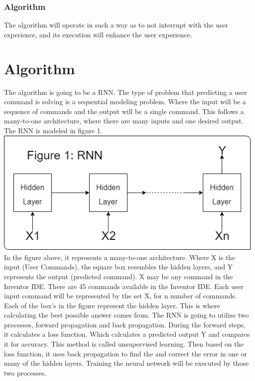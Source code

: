 \documentclass[onecolumn, draftclsnofoot,10pt, compsoc]{IEEEtran}
\begin{document}
\subsubsection{Algorithm}
The algorithm will operate in such a way as to not interrupt with the user experience, and its execution will enhance the user experience.
\null\newpage
\section{Algorithm}
The algorithm is going to be a RNN. The type of problem that predicting a user command is solving is a sequential modeling problem. Where the input will be a sequence of commands and the output will be a single command. This follows a many-to-one architecture, where there are many inputs and one desired output. The RNN is modeled in figure 1.\newline
\includegraphics{RNN.png} 
\newline
In the figure above, it represents a many-to-one architecture. Where X is the input (User Commands), the square box resembles the hidden layers, and Y represents the output (predicted command). X may be any command in the Inventor IDE. There are 45 commands available in the Inventor IDE. Each user input command will be represented by the set X, for n number of commands. Each of the box's in the figure represent the hidden layer. This is where calculating the best possible answer comes from. The RNN is going to utilize two processes, forward propagation and back propagation. During the forward steps, it calculates a loss function. Which calculates a predicted output Y and compares it for accuracy. This method is called unsupervised learning. Then based on the loss function, it uses back propagation to find the and correct the error in one or many of the hidden layers. Training the neural network will be executed by those two processes. 
\end{document}
